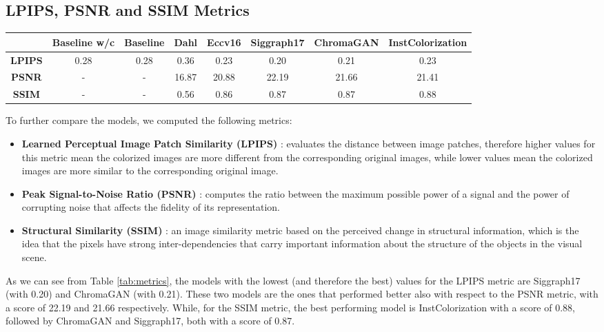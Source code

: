 \subsection{LPIPS, PSNR and SSIM Metrics}

\begin{table*}[ht]
	\begin{center}
		\begin{tabular}{c|ccccccc}
			& \textbf{Baseline w/c}&\textbf{Baseline} & \textbf{Dahl} & \textbf{Eccv16} & \textbf{Siggraph17} & \textbf{ChromaGAN} & \textbf{InstColorization}  \\
			\midrule
			\textbf{LPIPS} & 0.28 & 0.28 & 0.36 & 0.23 & 0.20 & 0.21 & 0.23 \\
			\midrule
			\textbf{PSNR} & - & - & 16.87 & 20.88 & 22.19 & 21.66 & 21.41 \\
			\midrule
			\textbf{SSIM} & - & - & 0.56 & 0.86 & 0.87 & 0.87 & 0.88 \\
		\end{tabular}
	\end{center}
	\caption{{\small  Summary of the LPIPS, PSNR and SSIM metrics computed on the different models.}}
	\label{tab:metrics}
\end{table*}

To further compare the models, we computed the following metrics:
\begin{itemize}
	\item \textbf {Learned Perceptual Image Patch Similarity (LPIPS)} \cite{lpips}: evaluates the distance between image patches, therefore higher values for this metric mean the colorized images are more different from the corresponding original images, while lower values mean the colorized images are more similar to the corresponding original image.
	\item \textbf {Peak Signal-to-Noise Ratio (PSNR)} \cite{psnr-ssim}: computes the ratio between the maximum possible power of a signal and the power of corrupting noise that affects the fidelity of its representation.
	\item \textbf {Structural Similarity (SSIM)} \cite{psnr-ssim}: an image similarity metric based on the perceived change in structural information, which is the idea that the pixels have strong inter-dependencies that carry important information about the structure of the objects in the visual scene.
\end{itemize}

As we can see from Table \ref{tab:metrics}, the models with the lowest (and therefore the best) values for the
LPIPS metric are Siggraph17 (with 0.20) and ChromaGAN (with 0.21). These two models are the ones that performed better
also with respect to the PSNR metric, with a score of 22.19 and 21.66 respectively. While, for the SSIM metric, the
best performing model is InstColorization with a score of 0.88, followed by ChromaGAN and Siggraph17, both with a
score of 0.87.

